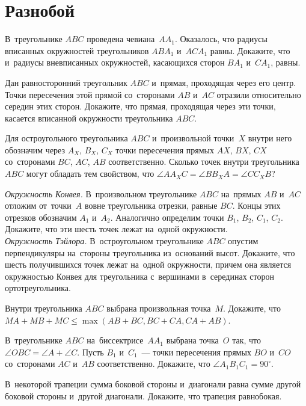 

\section*{Разнобой}


\begin{problems}

\item
В~треугольнике $ABC$ проведена чевиана~$A A_1$.
Оказалось, что радиусы вписанных окружностей треугольников $A B A_1$
и~$A C A_1$ равны.
Докажите, что и~радиусы вневписанных окружностей, касающихся сторон
$B A_1$ и~$C A_1$, равны.

\item
Дан равносторонний треугольник $ABC$ и~прямая, проходящая через его центр.
Точки пересечения этой прямой со~сторонами $AB$ и~$AC$ отразили относительно
середин этих сторон.
Докажите, что прямая, проходящая через эти точки, касается вписанной окружности
треугольника $ABC$.

\item
Для остроугольного треугольника $ABC$ и~произвольной точки~$X$ внутри него
обозначим через $A_X$, $B_X$, $C_X$ точки пересечения прямых $AX$, $BX$, $CX$
со~сторонами $BC$, $AC$, $AB$ соответственно.
Сколько точек внутри треугольника $ABC$ могут обладать тем свойством, что
$\angle A A_X C = \angle B B_X A = \angle C C_X B$?

\item
\subproblem\emph{Окружность Конвея.}
В~произвольном треугольнике $ABC$ на~прямых $AB$ и~$AC$ отложим от~точки~$A$
вовне треугольника отрезки, равные $BC$.
Концы этих отрезков обозначим $A_1$ и~$A_2$.
Аналогично определим точки $B_1$, $B_2$, $C_1$, $C_2$.
Докажите, что эти шесть точек лежат на~одной окружности.
\\
\subproblem\emph{Окружность Тэйлора.}
В~остроугольном треугольнике $ABC$ опустим перпендикуляры на~стороны
треугольника из~оснований высот.
Докажите, что шесть получившихся точек лежат на~одной окружности, причем она
является окружностью Конвея для треугольника с~вершинами в~серединах сторон
ортотреугольника.

\item
Внутри треугольника $ABC$ выбрана произвольная точка~$M$.
Докажите, что
\(
    MA + MB + MC
\leq
    \max (AB + BC, BC + CA, CA + AB)
\).

\item
В~треугольнике $ABC$ на~биссектрисе~$A A_1$ выбрана точка~$O$ так, что
$\angle OBC = \angle A + \angle C$.
Пусть $B_1$ и~$C_1$~--- точки пересечения прямых $BO$ и~$CO$ со~сторонами $AC$
и~$AB$ соответственно.
Докажите, что $\angle A_1 B_1 C_1 = 90^{\circ}$.

\item
В~некоторой трапеции сумма боковой стороны и~диагонали равна сумме другой
боковой стороны и~другой диагонали.
Докажите, что трапеция равнобокая.

\end{problems}

